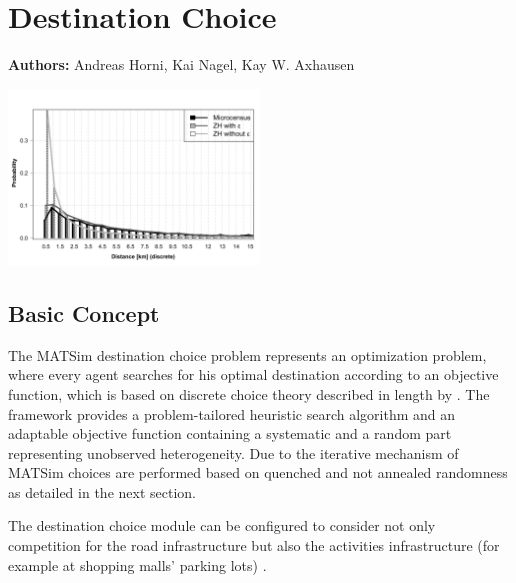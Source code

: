 \chapter{Destination Choice}
\label{ch:destinationchoice}
\hfill \textbf{Authors:} Andreas Horni, Kai Nagel, Kay W. Axhausen

\begin{center} \includegraphics[width=0.5\textwidth, angle=0]{extending/figures/dc/zhLeisure.pdf} \end{center}


\section{Basic Concept}
The MATSim destination choice problem represents an optimization problem, where every agent searches for his optimal destination according to an objective function, which is based on discrete choice theory described in length by \citet[][]{Horni_PhDThesis_2013, HorniEtAl_unpub_TRB_2012}. The framework provides a problem-tailored heuristic search algorithm and an adaptable objective function containing a systematic and a random part representing unobserved heterogeneity. Due to the iterative mechanism of MATSim choices are performed based on quenched and not annealed randomness as detailed in the next section. 

The destination choice module can be configured to consider not only competition for the road infrastructure but also the activities infrastructure (for example at shopping malls' parking lots) \citep[][]{HorniEtAl_TRR_2009}.

